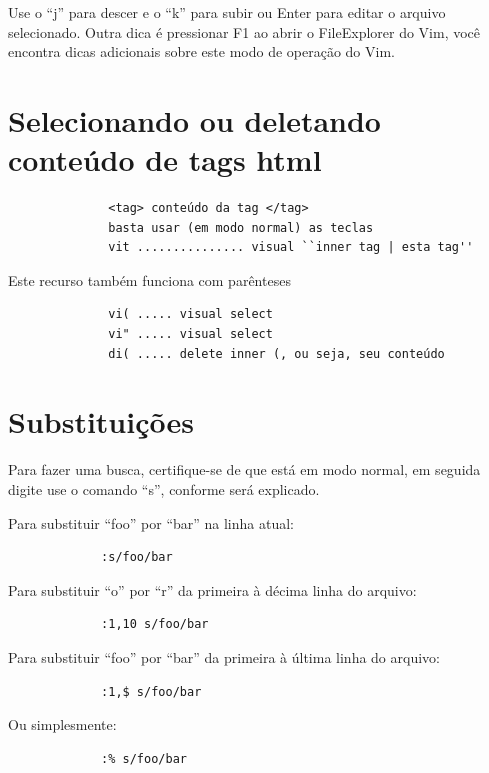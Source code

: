 \documentclass[10pt,a4paper,openany]{book}
\begin{document}
Use o ``j'' para descer e o ``k'' para subir ou Enter para editar o
arquivo selecionado. Outra dica é pressionar F1 ao abrir o
FileExplorer do Vim, você encontra dicas adicionais sobre este modo de
operação do Vim.

\section{Selecionando ou deletando conteúdo de tags html}
\label{Selecionando ou deletando conteúdo de tags html}

\begin{verbatim}
			  <tag> conteúdo da tag </tag>
			  basta usar (em modo normal) as teclas
			  vit ............... visual ``inner tag | esta tag''
\end{verbatim}

Este recurso também funciona com parênteses

\begin{verbatim}
			  vi( ..... visual select
			  vi" ..... visual select
			  di( ..... delete inner (, ou seja, seu conteúdo
\end{verbatim}


\section{Substituições }
\label{Substituições }

Para fazer uma busca, certifique-se de que está em modo normal, em
seguida digite use o comando ``s'', conforme será explicado.

Para substituir ``foo'' por ``bar'' na linha atual:

\begin{verbatim}
			 :s/foo/bar
\end{verbatim}

Para substituir ``o'' por ``r'' da primeira à décima linha do arquivo:

\begin{verbatim}
			 :1,10 s/foo/bar
\end{verbatim}

Para substituir ``foo'' por ``bar'' da primeira à última linha do arquivo:

\begin{verbatim}
			 :1,$ s/foo/bar
\end{verbatim}

Ou simplesmente:

\begin{verbatim}
			 :% s/foo/bar
\end{verbatim}
\end{document}

